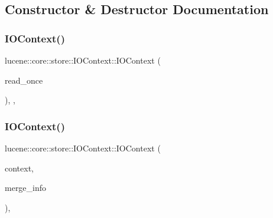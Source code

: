 \subsection{Constructor \& Destructor Documentation}
\mbox{\label{classlucene_1_1core_1_1store_1_1IOContext_a6b459b5ced9ef6f6a337298b314767a4}} 
\subsubsection{\texorpdfstring{I\+O\+Context()}{IOContext()}\hspace{0.1cm}{\footnotesize\ttfamily [1/7]}}
{\footnotesize\ttfamily lucene\+::core\+::store\+::\+I\+O\+Context\+::\+I\+O\+Context (\begin{DoxyParamCaption}\item[{\mbox{\hyperlink{ZlibCrc32_8h_a2c212835823e3c54a8ab6d95c652660e}{const}} bool}]{read\+\_\+once }\end{DoxyParamCaption})\hspace{0.3cm}{\ttfamily [inline]}, {\ttfamily [explicit]}, {\ttfamily [private]}}

\mbox{\label{classlucene_1_1core_1_1store_1_1IOContext_a431588a61e52cf327663989bb66f785d}} 
\subsubsection{\texorpdfstring{I\+O\+Context()}{IOContext()}\hspace{0.1cm}{\footnotesize\ttfamily [2/7]}}
{\footnotesize\ttfamily lucene\+::core\+::store\+::\+I\+O\+Context\+::\+I\+O\+Context (\begin{DoxyParamCaption}\item[{\mbox{\hyperlink{ZlibCrc32_8h_a2c212835823e3c54a8ab6d95c652660e}{const}} \mbox{\hyperlink{classlucene_1_1core_1_1store_1_1IOContext_abe5d85deaa062a50cf92336fd3aeea96}{Context}}}]{context,  }\item[{\mbox{\hyperlink{ZlibCrc32_8h_a2c212835823e3c54a8ab6d95c652660e}{const}} \mbox{\hyperlink{classlucene_1_1core_1_1store_1_1MergeInfo}{Merge\+Info}}}]{merge\+\_\+info }\end{DoxyParamCaption})\hspace{0.3cm}{\ttfamily [inline]}, {\ttfamily [private]}}

